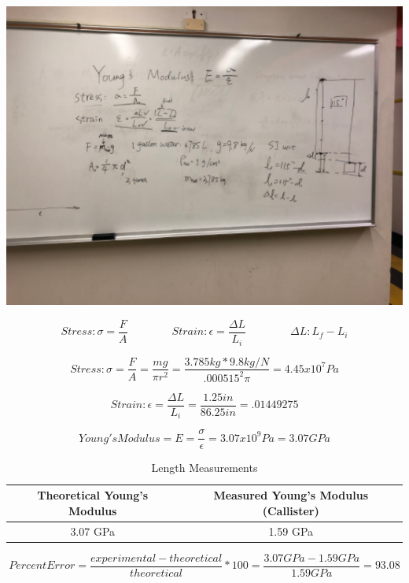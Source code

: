 \documentclass{article}
\begin{document}
\begin{center}
\includegraphics[width=400pt]{NylonEquations.png}
\end{center}

$$Stress: \sigma = \frac{F}{A} \qquad \qquad Strain: \epsilon = \frac{\Delta L}{L_i} \qquad \qquad \Delta L: L_f - L_i$$

$$Stress: \sigma = \frac{F}{A} = \frac{mg}{\pi r^2} = \frac{3.785kg * 9.8 kg/N}{.000515^2 \pi} = 4.45 x 10^7 Pa$$

$$Strain: \epsilon = \frac{\Delta L}{L_i} = \frac{1.25 in}{86.25 in} = .01449275$$

$$Young's Modulus = E = \frac{\sigma}{\epsilon} = 3.07 x 10^9 Pa = 3.07 GPa$$

\begin{table}[H]
\begin{center}
\begin{tabular}{c|c}
Theoretical Young's Modulus & Measured Young's Modulus (Callister)\\
\hline
3.07 GPa & 1.59 GPa\\
\end{tabular}
\caption{Length Measurements}
\end{center}
\end{table}

$$Percent Error = \frac{experimental - theoretical}{theoretical} * 100 = \frac{3.07 GPa - 1.59 GPa}{1.59 GPa} = 93.08$$
\vspace{.5cm}
\end{document}
